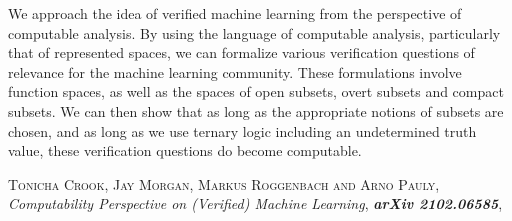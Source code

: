 \documentclass[bsl,meeting]{asl}
\begin{document}
We approach the idea of verified machine learning from the perspective of computable analysis. By using the language of computable analysis, particularly that of represented spaces, we can formalize various verification questions of relevance for the machine learning community. These formulations involve function spaces, as well as the spaces of open subsets, overt subsets and compact subsets. We can then show that as long as the appropriate notions of subsets are chosen, and as long as we use ternary logic including an undetermined truth value, these verification questions do become computable.
\begin{thebibliography}{10}

{\scshape Tonicha Crook, Jay Morgan, Markus Roggenbach and Arno Pauly},
{\itshape  Computability Perspective on (Verified) Machine Learning},
{\bfseries\itshape arXiv 2102.06585},
\end{thebibliography}
\end{document}
